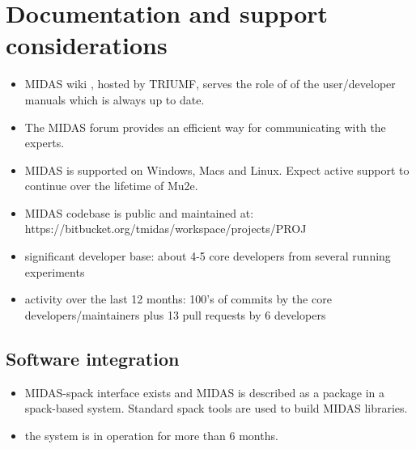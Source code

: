 \section{Documentation and support considerations}

\begin{itemize}
\item
  MIDAS wiki \cite{2025_MIDAS_WIKI}, hosted by TRIUMF, serves the role of 
  of the user/developer manuals which is always up to date.
\item 
  The MIDAS forum provides an efficient way for communicating with the experts.
\item
  MIDAS is supported on Windows, Macs and Linux.
  Expect active support to continue over the lifetime of Mu2e.
\item 
  MIDAS codebase is public and maintained at: https://bitbucket.org/tmidas/workspace/projects/PROJ
\item
  significant developer base: about 4-5 core developers from several running experiments
\item
  activity over the last 12 months: 100's of commits by the core developers/maintainers plus
  13 pull requests by 6 developers
\end{itemize}


\subsection{Software integration}
\begin{itemize}
\item 
  MIDAS-spack interface exists and MIDAS is described as a package in a spack-based system.
  Standard spack tools are used to build MIDAS libraries.
\item
  the system is in operation for more than 6 months.
\end{itemize}

